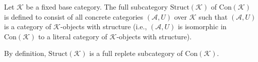 Let $\mathcal{K}$ be a fixed base category. The full subcategory $\text{Struct}(\mathcal{K})$ of $\text{Con}(\mathcal{K})$ is defined to consist of all concrete categories $(\mathcal{A}, U)$ over $\mathcal{K}$ such that $(\mathcal{A}, U)$ is a category of $\mathcal{K}$-objects with structure (i.e., $(\mathcal{A}, U)$ is isomorphic in $\text{Con}(\mathcal{K})$ to a literal category of $\mathcal{K}$-objects with structure).

By definition, $\text{Struct}(\mathcal{K})$ is a full replete subcategory of $\text{Con}(\mathcal{K})$.
